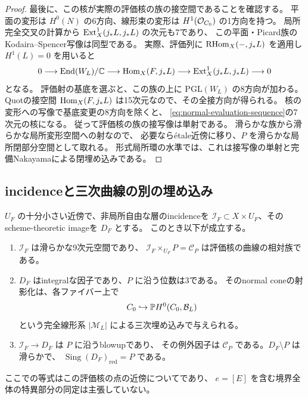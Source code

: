 \begin{proof}
最後に、この核が実際の評価核の族の接空間であることを確認する。
平面の変形は $H^0(N)$ の6方向、線形束の変形は $H^1(\mathcal O_{C_0})$ の1方向を持つ。
局所完全交叉の計算から $\operatorname{Ext}^1_X(j_*L,j_*L)$ の次元も7であり、
この平面・Picard族のKodaira--Spencer写像は同型である。
実際、評価列に $\operatorname{RHom}_X(-,j_*L)$ を適用し $H^1(L)=0$ を用いると
\[
 0\longrightarrow\operatorname{End}(W_L)/\mathbb C
 \longrightarrow\operatorname{Hom}_X(F,j_*L)
 \longrightarrow\operatorname{Ext}^1_X(j_*L,j_*L)\longrightarrow0
\]
となる。
評価射の基底を選ぶと、この族の上に $\mathrm{PGL}(W_L)$ の8方向が加わる。
Quotの接空間 $\operatorname{Hom}_X(F,j_*L)$ は15次元なので、その全接方向が得られる。
核の変形への写像で基底変更の8方向を除くと、
\eqref{eq:normal-evaluation-sequence}の7次元の核になる。
従って評価核の族の接写像は単射である。
滑らかな族から滑らかな局所変形空間への射なので、
必要ならétale近傍に移り、$P$ を滑らかな局所閉部分空間として取れる。
形式局所環の水準では、これは接写像の単射と完備Nakayamaによる閉埋め込みである。
\end{proof}

\subsection{incidenceと三次曲線の別の埋め込み}

\begin{theorem}[評価核に沿う境界の三次錐]\label{thm:local-bn-cubic}
$U_F$ の十分小さい近傍で、非局所自由な層のincidenceを
$\mathcal I_F\subset X\times U_F$、そのscheme-theoretic imageを $D_F$ とする。
このとき以下が成立する。
\begin{enumerate}
 \item $\mathcal I_F$ は滑らかな9次元空間であり、
 $\mathcal I_F\times_{U_F}P=\mathscr C_P$ は評価核の曲線の相対族である。
 \item $D_F$ はintegralな因子であり、$P$ に沿う位数は3である。
 そのnormal coneの射影化は、各ファイバー上で
 \[
 C_0\hookrightarrow\mathbb P H^0(C_0,\mathcal B_L)
 \]
 という完全線形系 $|\mathcal M_L|$ による三次埋め込みで与えられる。
 \item $\mathcal I_F\to D_F$ は $P$ に沿うblowupであり、
 その例外因子は $\mathscr C_P$ である。$D_F\setminus P$ は滑らかで、
 $\operatorname{Sing}(D_F)_{\mathrm{red}}=P$ である。
\end{enumerate}
ここでの等式はこの評価核の点の近傍についてであり、
$e=[E]$ を含む境界全体の特異部分の同定は主張していない。
\end{theorem}

